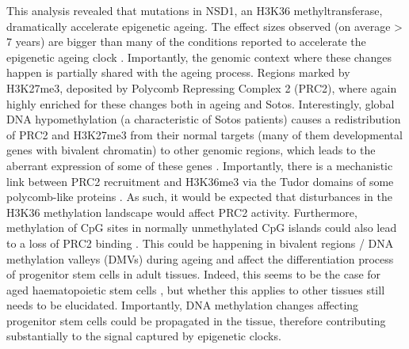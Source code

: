 This analysis revealed that mutations in NSD1, an H3K36 methyltransferase, dramatically accelerate epigenetic ageing. The effect sizes observed (on average > 7 years) are bigger than many of the conditions reported to accelerate the epigenetic ageing clock \cite{Horvath2018}. Importantly, the genomic context where these changes happen is partially shared with the ageing process. Regions marked by H3K27me3, deposited by Polycomb Repressing Complex 2 (\acrshort{PRC2}), where again highly enriched for these changes both in ageing and Sotos. Interestingly, global DNA hypomethylation (a characteristic of Sotos patients) causes a redistribution of \acrshort{PRC2} and H3K27me3 from their normal targets (many of them developmental genes with bivalent chromatin) to other genomic regions, which leads to the aberrant expression of some of these genes \cite{Reddington2013}. Importantly, there is a mechanistic link between PRC2 recruitment and H3K36me3 via the Tudor domains of some polycomb-like proteins \cite{Cai2013,Li2017}. As such, it would be expected that disturbances in the H3K36 methylation landscape would affect PRC2 activity. Furthermore, methylation of CpG sites in normally unmethylated CpG islands could also lead to a loss of PRC2 binding \cite{Li2017}. This could be happening in bivalent regions / DNA methylation valleys (\acrshort{DMV}s) during ageing and affect the differentiation process of progenitor stem cells in adult tissues. Indeed, this seems to be the case for aged haematopoietic stem cells \cite{Sun2014x,Beerman2013}, but whether this applies to other tissues still needs to be elucidated. Importantly, DNA methylation changes affecting progenitor stem cells could be propagated in the tissue, therefore contributing substantially to the signal captured by epigenetic clocks. 

\bigskip

